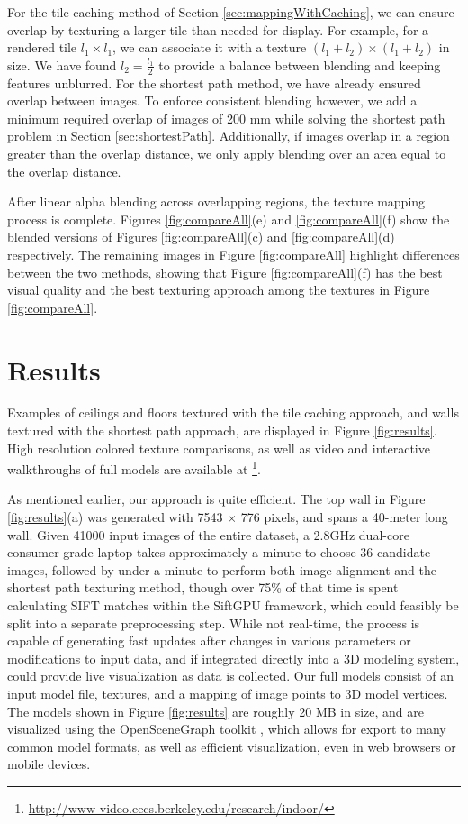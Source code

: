 \documentclass[]{spie}  %
\begin{document}
For the tile caching method of Section \ref{sec:mappingWithCaching}, we can ensure overlap by texturing a
larger tile than needed for display. For example, for a rendered tile
$l_1 \times l_1$, we can associate it with a texture $(l_1 + l_2)
\times (l_1 + l_2)$ in size.  We have found $l_2 = \frac{l_1}{2}$ to
provide a balance between blending and keeping features unblurred. For
the shortest path method, we have already ensured overlap between
images. To enforce consistent blending however, we add a minimum
required overlap of images of 200 mm while solving the shortest path
problem in Section \ref{sec:shortestPath}. Additionally, if images
overlap in a region greater than the overlap distance, we only apply
blending over an area equal to the overlap distance.

After linear alpha blending across overlapping regions, the texture mapping process is complete. Figures \ref{fig:compareAll}(e)
and \ref{fig:compareAll}(f) show the blended versions of Figures
\ref{fig:compareAll}(c) and \ref{fig:compareAll}(d) respectively. The
remaining images in Figure \ref{fig:compareAll} highlight differences
between the two methods, showing that Figure \ref{fig:compareAll}(f)
has the best visual quality and the best texturing approach among the
textures in Figure \ref{fig:compareAll}.

\section{Results}
\label{sec:results}
Examples of ceilings and floors textured with the tile caching
approach, and walls textured with the shortest path approach, are
displayed in Figure \ref{fig:results}. High resolution colored texture
comparisons, as well as video and interactive walkthroughs of full
models are available at
\footnote{\url{http://www-video.eecs.berkeley.edu/research/indoor/}}.

As mentioned earlier, our approach is quite efficient. The top wall in
Figure \ref{fig:results}(a) was generated with 7543 $\times$ 776
pixels, and spans a 40-meter long wall. Given 41000 input images of
the entire dataset, a 2.8GHz dual-core consumer-grade laptop takes
approximately a minute to choose 36 candidate images, followed by
under a minute to perform both image alignment and the shortest path
texturing method, though over 75\% of that time is spent calculating
SIFT matches within the SiftGPU framework, which could feasibly be
split into a separate preprocessing step. While not real-time, the
process is capable of generating fast updates after changes in various
parameters or modifications to input data, and if integrated directly
into a 3D modeling system, could provide live visualization as data is
collected. Our full models consist of an input model file, textures,
and a mapping of image points to 3D model vertices. The models shown
in Figure \ref{fig:results} are roughly 20 MB in size, and are
visualized using the OpenSceneGraph toolkit \cite{openscenegraph},
which allows for export to many common model formats, as well as
efficient visualization, even in web browsers or mobile devices.
\end{document}
